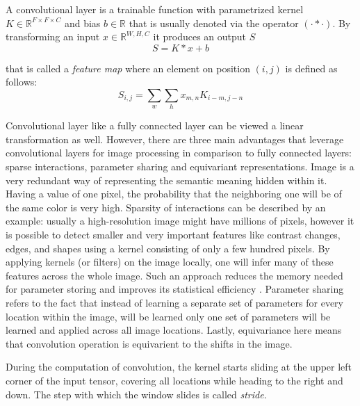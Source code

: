 \begin{definition}
	A convolutional layer is a trainable function with parametrized kernel $K \in \mathbb{R}^{F \times F \times C}$ and bias $b \in \mathbb{R}$ that is usually denoted via the operator $(\cdot * \cdot)$. By transforming an input $x \in \mathbb{R}^{W, H, C}$ it produces an output $S$
	\begin{equation}
		S = K * x + b
	\end{equation}

	that is called a \textit{feature map} where an element on position $(i, j)$ is defined as follows:
		\begin{equation}
			S_{i, j} = \sum_{w} \sum_{h} x_{m, n}  K_{i - m, j - n}
		\end{equation}
\end{definition}

Convolutional layer like a fully connected layer can be viewed a linear transformation as well. However, there are three main advantages that leverage convolutional layers for image processing in comparison to fully connected layers: sparse interactions, parameter sharing and equivariant representations. Image is a very redundant way of representing the semantic meaning hidden within it. Having a value of one pixel, the probability that the neighboring one will be of the same color is very high. Sparsity of interactions can be described by an example: usually a high-resolution image might have millions of pixels, however it is possible to detect smaller and very important features like contrast changes, edges, and shapes using a kernel consisting of only a few hundred pixels. By applying kernels (or filters) on the image locally, one will infer many of these features across the whole image. Such an approach reduces the memory needed for parameter storing and improves its statistical eﬃciency \cite{Goodfellow_2016}. Parameter sharing refers to the fact that instead of learning a separate set of parameters for every location within the image, will be learned only one set of parameters will be learned and applied across all image locations. Lastly, equivariance here means that convolution operation is equivarient to the shifts in the image.

\begin{definition}[Stride]
	During the computation of convolution, the kernel starts sliding at the upper left corner of the input tensor, covering all locations while heading to the right and down. The step with which the window slides is called \textit{stride}. 
\end{definition}

